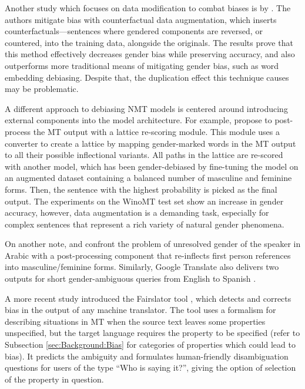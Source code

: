 Another study which focuses on data modification to combat biases is by \citet{lu2020gender}. The authors mitigate bias with counterfactual data augmentation,  which inserts counterfactuals—sentences where gendered components are reversed, or countered, into the training data, alongside the originals. The results prove that this method effectively decreases gender bias while preserving accuracy, and also outperforms more traditional means of mitigating gender bias, such as word embedding debiasing. Despite that, the duplication effect this technique causes may be problematic.

A different approach to debiasing NMT models is centered around introducing external components into the model architecture. For example, \citet{Saunders_2020} propose to post-process the MT output with a lattice re-scoring module. This module uses a converter to create a lattice by mapping gender-marked words in the MT output to all their possible inflectional variants. All paths in the lattice are re-scored with another model, which has been gender-debiased by fine-tuning the model on an augmented dataset containing a balanced number of masculine and feminine forms. Then, the sentence with the highest probability is picked as the final output. The experiments on the WinoMT test set show an increase in gender accuracy, however, data augmentation is a demanding task, especially for complex sentences that represent a rich variety of natural gender phenomena. 

On another note, \citet{Habash_2019} and \citet{alhafni2020gender} confront the problem of unresolved gender of the speaker in Arabic with a post-processing component that re-inflects first person references into masculine/feminine forms. Similarly, Google Translate also delivers two outputs for short gender-ambiguous queries from English to Spanish \parencite{johnson2020scalable}.

A more recent study introduced the Fairslator tool \parencite{bias_taxonomy}, which detects and corrects bias in the output of any machine translator. The tool uses a formalism for describing situations in MT when the source text leaves some properties unspecified, but the target language requires the property to be specified (refer to Subsection \ref{sec:Background:Bias} for categories of properties which could lead to bias). It predicts the ambiguity and formulates human-friendly disambiguation questions for users of the type “Who is saying it?”, giving the option of selection of the property in question.

